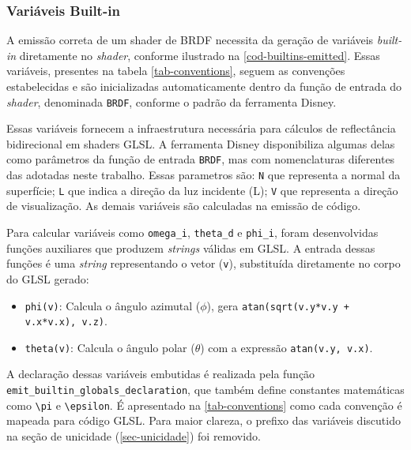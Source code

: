 \subsubsection{Variáveis Built-in}
A emissão correta de um shader de BRDF necessita da geração de variáveis \textit{built-in} diretamente no \textit{shader}, conforme ilustrado na \autoref{cod-builtins-emitted}. Essas variáveis, presentes na tabela \autoref{tab-conventions}, seguem as convenções estabelecidas e são inicializadas automaticamente dentro da função de entrada do \textit{shader}, denominada \verb|BRDF|, conforme o padrão da ferramenta Disney.

Essas variáveis fornecem a infraestrutura necessária para cálculos de reflectância bidirecional em shaders GLSL. A ferramenta Disney disponibiliza algumas delas como parâmetros da função de entrada \verb`BRDF`, mas com nomenclaturas diferentes das adotadas neste trabalho. Essas parametros são: \verb"N" que representa a normal da superfície; \verb"L" que indica a direção da luz incidente (L); \verb"V" que representa a direção de visualização. As demais variáveis são calculadas na emissão de código.

Para calcular variáveis como \verb`omega_i`, \verb`theta_d` e \verb`phi_i`, foram desenvolvidas funções auxiliares que produzem \textit{strings} válidas em GLSL. A entrada dessas funções é uma \textit{string} representando o vetor (\verb`v`), substituída diretamente no corpo do GLSL gerado:
\begin{itemize}
    \item \verb`phi(v)`: Calcula o ângulo azimutal ($\phi$), gera \verb`atan(sqrt(v.y*v.y + v.x*v.x), v.z)`.
    \item \verb`theta(v)`: Calcula o ângulo polar ($\theta$) com a expressão \verb`atan(v.y, v.x)`.
\end{itemize}

A declaração dessas variáveis embutidas é realizada pela função \\ \verb`emit_builtin_globals_declaration`, que também define constantes matemáticas como \verb`\pi`  e \verb`\epsilon`. É apresentado na \autoref{tab-conventions} como cada convenção é mapeada para código GLSL. Para maior clareza, o prefixo das variáveis discutido na seção de unicidade (\autoref{sec-unicidade}) foi removido.

